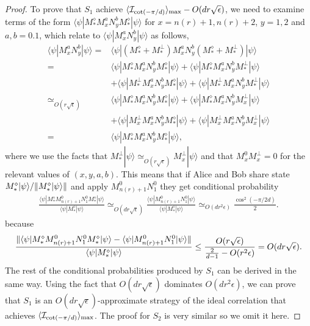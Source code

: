 \documentclass[11pt,letterpaper]{article}
\newcommand{\ket}[1]{|#1\rangle}
\newcommand{\bra}[1]{\langle#1|}
\DeclarePairedDelimiter{\norm}{\lVert}{\rVert}
\DeclarePairedDelimiter{\ip}{\langle}{\rangle}
\newcommand{\1}{\mathbb{1}}
\newcommand{\nr}{n(r)}
\newcommand{\I}{\mathcal{I}}
\newcommand{\ep}{\epsilon}
\newcommand{\se}{\sqrt{\epsilon}}
\newcommand{\appd}[1]{\simeq_{#1}}
\theoremstyle{definition}
\begin{document}
\begin{proof}
To prove that $S_1$ achieve $\ip{\I_{\cot(-\pi/d)}}_{\max} - O(d r\se)$, we need to examine terms of the form
$\bra{\psi} M_\ast^\diamond M_{x}^aN_y^b M_\ast^\diamond\ket{\psi}$ for $x = \nr+1,\nr+2$, $y=1,2$ and $a,b = 0.1$,
which relate to $\bra{\psi} M_x^a N_y^b \ket{\psi}$ as follows,
\begin{align*}
	   \bra{\psi} M_{x}^aN_y^b \ket{\psi} 
	= &\bra{\psi}(M_\ast^\diamond + M_\ast^\perp) M_x^a N_y^b (M_\ast^\diamond + M_\ast^\perp)\ket{\psi} \\
	= & \bra{\psi}M_\ast^\diamond M_x^aN_y^b M_\ast^\diamond\ket{\psi} + \bra{\psi}M_\ast^\diamond M_x^aN_y^b M_\ast^\perp\ket{\psi}\\
	&+\bra{\psi}M_\ast^\perp M_x^aN_y^b M_\ast^\diamond\ket{\psi} + \bra{\psi}M_\ast^\perp M_x^aN_y^b M_\ast^\perp\ket{\psi}\\
	\appd{O(r\se)}&  \bra{\psi}M_\ast^\diamond M_x^aN_y^b M_\ast^\diamond\ket{\psi} + \bra{\psi}M_\ast^\diamond M_x^aN_y^b M_x^\perp\ket{\psi} \\
	&+\bra{\psi}M_x^\perp M_x^aN_y^b M_\ast^\diamond\ket{\psi} + \bra{\psi}M_x^\perp M_x^aN_y^b M_x^\perp\ket{\psi}\\
	=&\bra{\psi}M_\ast^\diamond M_x^aN_y^b M_\ast^\diamond\ket{\psi},
\end{align*}
where we use the facts that $M_\ast^\perp \ket{\psi} \appd{O(r\se)} M_x^\perp \ket{\psi}$ and that 
$M_x^0 M_x^\perp = 0$ for the relevant values of $(x,y,a,b)$.
This means that if Alice and Bob share state $M_\ast^\diamond \ket{\psi}/\norm{M_\ast^\diamond \ket{\psi}}$ and apply $M_{\nr+1}^0N_1^0$
they get conditional probability
\begin{align*}
	\frac{\bra{\psi}M_\ast^\diamond M_{\nr+1}^0N_1^0 M_\ast^\diamond\ket{\psi}}{\bra{\psi} M_\ast^\diamond \ket{\psi}}  
	\appd{O(d r\se)} \frac{\bra{\psi} M_{\nr+1}^0N_1^0 \ket{\psi}}{\bra{\psi} M_\ast^\diamond \ket{\psi}}
	\appd{O(d r^2 \ep)}
	\frac{\cos^2(-\pi/2d)}{2}.
\end{align*} 
because
\begin{align*}
	\frac{ \norm{\bra{\psi}M_\ast^\diamond M_{\nr+1}^0N_1^0 M_\ast^\diamond\ket{\psi} -  \bra{\psi} M_{\nr+1}^0N_1^0 \ket{\psi}}}
	{\bra{\psi} M_\ast^\diamond \ket{\psi}} \leq \frac{O(r\se)}{\frac{2}{d-1} - O(r^2 \ep)} = O(d r  \se).
\end{align*}
The rest of the conditional probabilities produced by $S_1$ can be derived in the same way.
Using the fact that $O(d r \se)$ dominates $O(dr^2 \ep)$,
we can prove that $S_1$ is an $O(dr\se)$-approximate strategy of the ideal correlation that achieves $\ip{\I_{\cot(-\pi/d)}}_{\max}$.
The proof for $S_2$ is very similar so we omit it here.
\end{proof}
\end{document}
